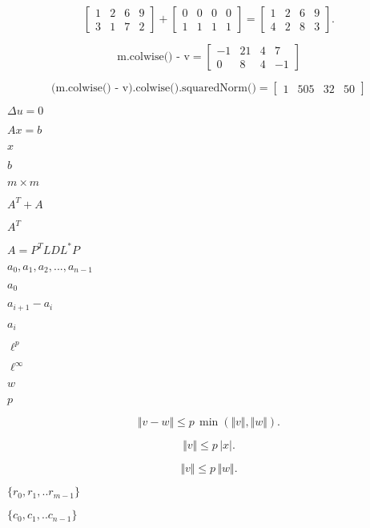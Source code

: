 \documentclass{article}
\begin{document}
\[ \begin{bmatrix} 1 & 2 & 6 & 9 \\ 3 & 1 & 7 & 2 \end{bmatrix} + \begin{bmatrix} 0 & 0 & 0 & 0 \\ 1 & 1 & 1 & 1 \end{bmatrix} = \begin{bmatrix} 1 & 2 & 6 & 9 \\ 4 & 2 & 8 & 3 \end{bmatrix}. \]
\pagebreak

\[ \mbox{m.colwise() - v} = \begin{bmatrix} -1 & 21 & 4 & 7 \\ 0 & 8 & 4 & -1 \end{bmatrix} \]
\pagebreak

\[ \mbox{(m.colwise() - v).colwise().squaredNorm()} = \begin{bmatrix} 1 & 505 & 32 & 50 \end{bmatrix} \]
\pagebreak

$ \Delta u = 0 $
\pagebreak

$ Ax=b $
\pagebreak

$ x $
\pagebreak

$ b $
\pagebreak

$ m \times m $
\pagebreak

$ A^T + A $
\pagebreak

$ A^T $
\pagebreak

$ A = P^TLDL^*P $
\pagebreak

$ a_0, a_1, a_2, ..., a_{n-1}$
\pagebreak

$ a_0 $
\pagebreak

$ a_{i+1}-a_{i}$
\pagebreak

$ a_i $
\pagebreak

$ \ell^p $
\pagebreak

$ \ell^\infty $
\pagebreak

$ w $
\pagebreak

$ p $
\pagebreak

\[ \Vert v - w \Vert \leqslant p\,\min(\Vert v\Vert, \Vert w\Vert). \]
\pagebreak

\[ \Vert v \Vert \leqslant p\,\vert x\vert. \]
\pagebreak

\[ \Vert v \Vert \leqslant p\,\Vert w\Vert. \]
\pagebreak

$ \{r_0,r_1,..r_{m-1}\} $
\pagebreak

$ \{c_0,c_1,..c_{n-1} \}$
\pagebreak
\end{document}

